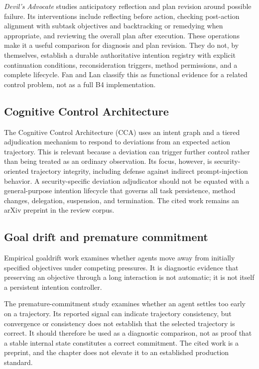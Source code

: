 \emph{Devil's Advocate} studies anticipatory reflection and plan revision around possible failure. Its interventions include reflecting before action, checking post-action alignment with subtask objectives and backtracking or remedying when appropriate, and reviewing the overall plan after execution. These operations make it a useful comparison for diagnosis and plan revision. They do not, by themselves, establish a durable authoritative intention registry with explicit continuation conditions, reconsideration triggers, method permissions, and a complete lifecycle. Fan and Lan classify this as functional evidence for a related control problem, not as a full B4 implementation.\autocite{wang2024devilsadvocate}

\subsection{Cognitive Control Architecture}

The Cognitive Control Architecture (CCA) uses an intent graph and a tiered adjudication mechanism to respond to deviations from an expected action trajectory. This is relevant because a deviation can trigger further control rather than being treated as an ordinary observation. Its focus, however, is security-oriented trajectory integrity, including defense against indirect prompt-injection behavior. A security-specific deviation adjudicator should not be equated with a general-purpose intention lifecycle that governs all task persistence, method changes, delegation, suspension, and termination. The cited work remains an arXiv preprint in the review corpus.\autocite{liang2025cca}

\subsection{Goal drift and premature commitment}

Empirical \gls{goaldrift} work examines whether agents move away from initially specified objectives under competing pressures. It is diagnostic evidence that preserving an objective through a long interaction is not automatic; it is not itself a persistent intention controller.\autocite{arike2025goaldrift}

The premature-commitment study examines whether an agent settles too early on a trajectory. Its reported signal can indicate trajectory consistency, but convergence or consistency does not establish that the selected trajectory is correct. It should therefore be used as a diagnostic comparison, not as proof that a stable internal state constitutes a correct commitment. The cited work is a preprint, and the chapter does not elevate it to an established production standard.\autocite{mehta2026premature}

